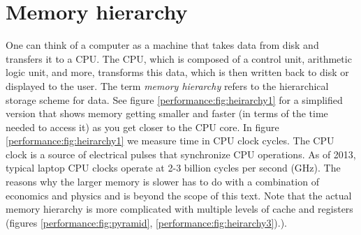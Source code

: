 \section{Memory hierarchy}
One can think of a computer as a machine that takes data from disk and transfers it to a CPU.  The CPU, which is composed of a control unit, arithmetic logic unit, and more, transforms this data, which is then written back to disk or displayed to the user.  The term \emph{memory hierarchy} refers to the hierarchical storage scheme for data.  See figure \ref{performance:fig:heirarchy1} for a simplified version that shows memory getting smaller and faster (in terms of the time needed to access it) as you get closer to the CPU core.  In figure \ref{performance:fig:heirarchy1} we measure time in CPU clock cycles.  The CPU clock is a source of electrical pulses that synchronize CPU operations.  As of 2013, typical laptop CPU clocks operate at 2-3 billion cycles per second (GHz). The reasons why the larger memory is slower has to do with a combination of economics and physics and is beyond the scope of this text.  Note that the actual memory hierarchy is more complicated with multiple levels of cache and registers (figures \ref{performance:fig:pyramid}, \ref{performance:fig:heirarchy3}).).

